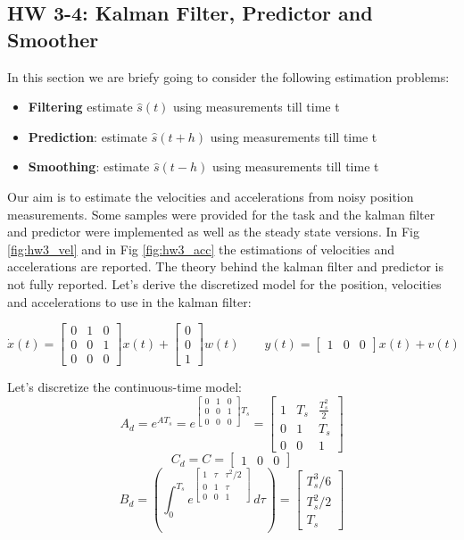 \documentclass[a4paper,12pt]{article}
\begin{document}
\subsection{HW 3-4: Kalman Filter, Predictor and Smoother}
In this section we are briefy going to consider the following estimation problems:
\begin{itemize}
    \item \textbf{Filtering} estimate $\hat{s}(t)$ using measurements till time t
    \item \textbf{Prediction}: estimate $\hat{s}(t+h)$ using measurements till time t
    \item \textbf{Smoothing}: estimate $\hat{s}(t-h)$ using measurements till time t
\end{itemize}
\bigskip

Our aim is to estimate the velocities and accelerations from noisy position measurements. Some samples were provided for the task and the kalman filter and predictor were implemented as well as the steady state versions. In Fig \ref{fig:hw3_vel} and in Fig \ref{fig:hw3_acc} the estimations of velocities and accelerations are reported. The theory behind the kalman filter and predictor is not fully reported. Let's derive the discretized model for the position, velocities and accelerations to use in the kalman filter:

\begin{equation}
    \dot{x}(t) =  \begin{bmatrix}  0&1&0 \\ 0&0&1\\0&0&0 \end{bmatrix} x(t) + \begin{bmatrix}  0\\0\\1 \end{bmatrix} w(t)
    \qquad
    y(t) = \begin{bmatrix}  1&0&0 \end{bmatrix}x(t) + v(t)
\end{equation}

\noindent Let's discretize the continuous-time model:
\[
    A_d = e^{AT_s} = e^{\begin{bmatrix}  0&1&0 \\ 0&0&1\\0&0&0 \end{bmatrix}T_s} = \begin{bmatrix} 1&T_s&\frac{T_s^2}{2}\\0&1&T_s\\0&0&1 \end{bmatrix}
\]
\[
    C_d = C = \begin{bmatrix} 1&0&0 \end{bmatrix}
\]
\[
    B_d = \left (\int_{0}^{T_s} e^{\begin{bmatrix} 1&\tau&\tau^2/2\\0&1&\tau\\0&0&1 \end{bmatrix}} \,d\tau \right) = \begin{bmatrix} T_s^3/6\\T_s^2/2\\T_s \end{bmatrix}
\]
\end{document}
